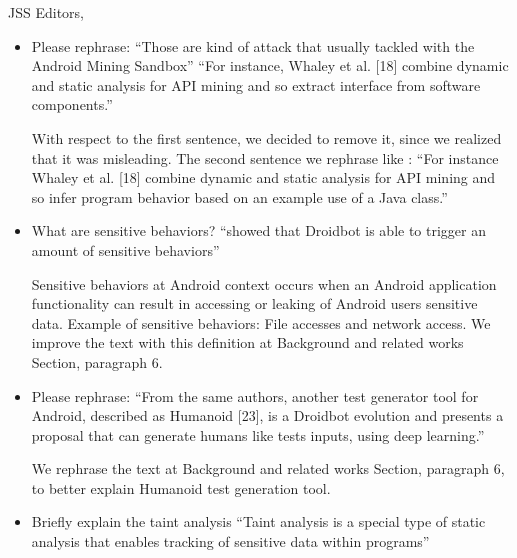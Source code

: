 \documentclass{letter}
\begin{document}
\begin{letter}{JSS Editors,}
\begin{itemize}
\vspace{0.2cm}

\item Please rephrase:
``Those are kind of attack that usually tackled with the Android Mining Sandbox''
``For instance, Whaley et al. [18] combine dynamic and static analysis for API mining and so extract interface from software components.''


\vspace{0.2cm}

{\color{blue}{\bf Answer.} With respect to the first sentence, we decided to remove it, since we realized that it was misleading. The second sentence we rephrase like : ``For instance Whaley et al. [18] combine dynamic and static analysis for API mining and so infer program behavior based on an example use of a Java class.''}

\vspace{0.2cm}

\item What are sensitive behaviors? ``showed that Droidbot is able to trigger an amount of sensitive behaviors''


\vspace{0.2cm}

{\color{blue}{\bf Answer.} Sensitive behaviors at Android context occurs when  an Android application functionality can result in accessing or leaking of Android users sensitive data. Example of sensitive behaviors: File accesses and network access. We improve the text with this definition at Background and related works Section, paragraph 6.}

\vspace{0.2cm}

\item Please rephrase:
``From the same authors, another test generator tool for Android, described as Humanoid [23], is a Droidbot evolution and
presents a proposal that can generate humans like tests inputs, using deep learning.''


\vspace{0.2cm}

{\color{blue}{\bf Answer.} We rephrase the text at Background and related works Section, paragraph 6, to better explain Humanoid test generation tool.}

\vspace{0.2cm}

\item Briefly explain the taint analysis
``Taint analysis is a special type of static analysis that enables tracking of sensitive data within programs''



\end{itemize}
\end{letter}
\end{document}
